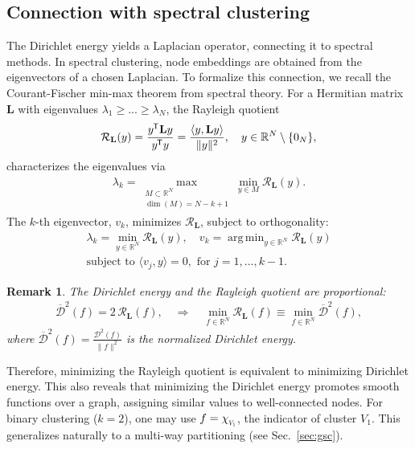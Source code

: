 \documentclass[10pt]{article} %
\def\rmL{{\mathbf{L}}}
\newcommand{\R}{\mathbb{R}}
\DeclareMathOperator*{\argmin}{arg\,min}
\newtheorem{remark}{Remark}[section]
\newcommand{\D}[2]{\mathcal{D}^2_{#1}(#2)}
\newcommand{\Dnorm}[2]{\overline{\mathcal{D}}_{#1}^2(#2)}
\renewcommand{\dots}{...}
\renewcommand*{\top}{{\mkern-1.4mu\mathsf{T}}}
\newcommand{\chivec}[1] {{\chi_{\raisebox{-0.15em}{\scalebox{0.6}{$#1$}}}}}
\begin{document}
\subsection{Connection with spectral clustering}
\label{sec:connection-to-spectral-clustering}

The Dirichlet energy yields a Laplacian operator, connecting it to spectral methods. In spectral clustering, node embeddings are obtained from the eigenvectors of a chosen Laplacian.
To formalize this connection, we recall the Courant-Fischer min-max theorem \citep{matrixanalysis1985} from spectral theory.
For a Hermitian matrix $\rmL$ with eigenvalues $\lambda_1 \geq \dots \geq \lambda_N$, the Rayleigh quotient
\begin{equation}\label{eq:rayleigh-quotient}
  \mathcal{R}_{\rmL}(y) = \frac{y^\top \rmL y}{y^\top y} = \frac{\langle y, \rmL y \rangle}{\|y\|^2}, \quad y \in \mathbb{R}^N \setminus \{0_N\},
\end{equation}
characterizes the eigenvalues via
\begin{align}
  \lambda_k = \max_{\substack{M \subset \mathbb{R}^N \\ \dim(M) = N-k+1}} \min_{y \in M} \mathcal{R}_{\rmL}(y).
\end{align}
The $k$-th eigenvector, $v_k$, minimizes $\mathcal{R}_{\rmL}$, subject to orthogonality:
\begin{align}\label{eq:rayleigh-ritz}
\lambda_k = \min_{y \in \mathbb{R}^N} \mathcal{R}_{\rmL}(y), \quad
v_k = \argmin_{y \in \mathbb{R}^N} \mathcal{R}_{\rmL}(y) \\
\text{subject to } \langle v_j, y \rangle = 0, \text{ for } j=1,\dots,k-1.
\end{align}
%
\begin{remark}\label{remark:Dirichlet-Rayleigh-equivalence}
The Dirichlet energy and the Rayleigh quotient are proportional:
\begin{align}
  \Dnorm{}{f} = 2 \, \mathcal{R}_{\rmL}(f), \quad \Rightarrow \quad \min_{f \in \R^N} \mathcal{R}_{\rmL}(f) \equiv \min_{f \in \R^N} \Dnorm{}{f}, \label{eq:Dirichlet-Rayleigh-equivalence}
\end{align}
where $\Dnorm{}{f} = \frac{\D{}{f}}{\|f\|^2}$ is the \emph{normalized Dirichlet energy}.
\end{remark}
%
Therefore, minimizing the Rayleigh quotient is equivalent to minimizing Dirichlet energy. This also reveals that minimizing the Dirichlet energy promotes smooth functions over a graph, assigning similar values to well-connected nodes. For binary clustering ($k=2$), one may use $f = \chivec{V_1}$, the indicator of cluster $V_1$. This generalizes naturally to a multi-way partitioning (see Sec.~\ref{sec:gsc}).
\end{document}
